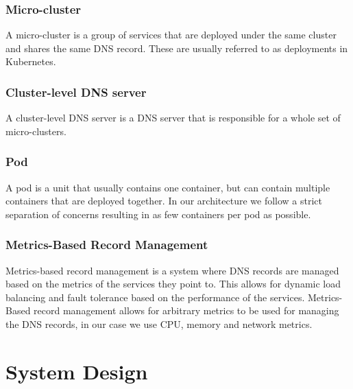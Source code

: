 \documentclass[12pt]{article}
\begin{document}
\subsubsection{Micro-cluster}
    A micro-cluster is a group of services that are deployed under the same cluster and shares the same DNS record.
    These are usually referred to as deployments in Kubernetes.
\subsubsection{Cluster-level DNS server}
    A cluster-level DNS server is a DNS server that is responsible for a whole set of micro-clusters.
\subsubsection{Pod}
    A pod is a unit that usually contains one container, but can contain multiple containers that are deployed together.
    In our architecture we follow a strict separation of concerns resulting in as few containers per pod as possible.
\subsubsection{Metrics-Based Record Management}
    Metrics-based record management is a system where DNS records are managed based on the metrics of the services they point to.
    This allows for dynamic load balancing and fault tolerance based on the performance of the services. Metrics-Based record management
    allows for arbitrary metrics to be used for managing the DNS records, in our case we use CPU, memory and network metrics.

\section{System Design}
\end{document}
